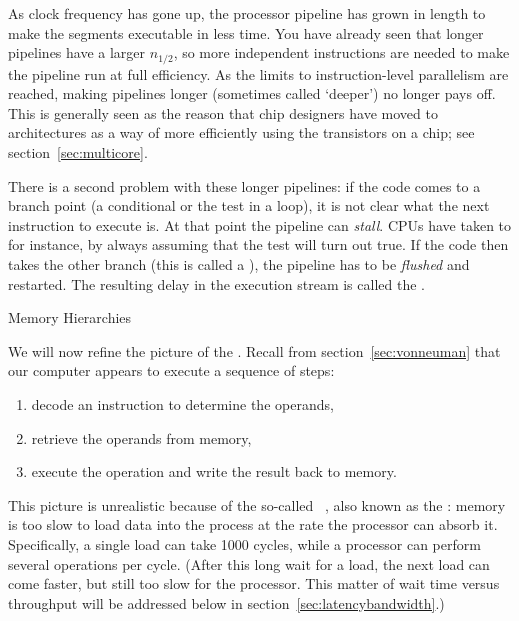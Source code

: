 As clock frequency has gone up, the processor pipeline has grown in
length to make the segments executable in less time. You have already
seen that longer pipelines have a larger $n_{1/2}$, so more
independent instructions are needed to make the pipeline run at full
efficiency. As the limits to instruction-level parallelism are
reached, making pipelines longer (sometimes
called `deeper') no longer pays off. This is
generally seen as the reason that chip designers have moved to
 architectures as a way of more efficiently
using the transistors on a chip;
see section~\ref{sec:multicore}.

There is a second problem with these longer pipelines: if the code
comes to a branch point (a conditional or the test in a loop), it is
not clear what the next instruction to execute is. At that point the
pipeline can \emph{stall}. \acp{CPU} have taken to
 for instance, by always assuming
that the test will turn out true. If the code then takes the other
branch (this is called a ), the
pipeline has to be \emph{flushed} and
restarted. The resulting delay in the execution stream is called the
.

 {Memory Hierarchies}
\label{sec:hierarchy}

We will now refine the picture of the .
Recall from section~\ref{sec:vonneuman} that our computer appears to execute
a sequence of steps:
\begin{enumerate}
\item decode an instruction to determine the operands,
\item retrieve the operands from memory,
\item execute the operation and write the result back to memory.
\end{enumerate}
This picture is unrealistic because of the
so-called ~\cite{Wulf:memory-wall},
also known as the :
memory is too slow to load data into the process at the rate the
processor can absorb it. Specifically, a single load can take 1000
cycles, while a processor can perform several operations per
cycle. (After this long wait for a load, the next load can come
faster, but still too slow for the processor. This matter of wait time
versus throughput will be addressed below in
section~\ref{sec:latencybandwidth}.)

